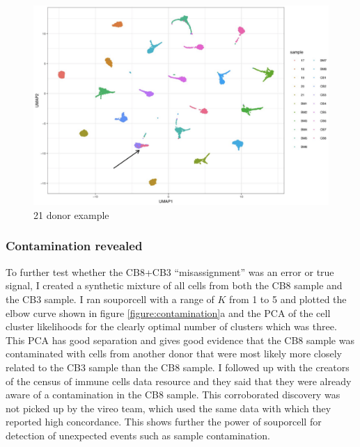 \begin{figure}[htbp!]
\caption{21 donor example}
\label{figure:21donor}
\begin{centering}

\includegraphics[width=\textwidth]{21donor.png} 
\end{centering}


\end{figure}

\subsubsection{Contamination revealed}

\par{
To further test whether the CB8+CB3 ``misassignment'' was an error or true signal, I created a synthetic mixture of all cells from both the CB8 sample and the CB3 sample. I ran souporcell with a range of $K$ from 1 to 5 and plotted the elbow curve shown in figure \ref{figure:contamination}a and the PCA of the cell cluster likelihoods for the clearly optimal number of clusters which was three. This PCA has good separation and gives good evidence that the CB8 sample was contaminated with cells from another donor that were most likely more closely related to the CB3 sample than the CB8 sample. I followed up with the creators of the census of immune cells data resource and they said that they were already aware of a contamination in the CB8 sample. This corroborated discovery was not picked up by the vireo team, which used the same data with which they reported high concordance. This shows further the power of souporcell for detection of unexpected events such as sample contamination.
}

